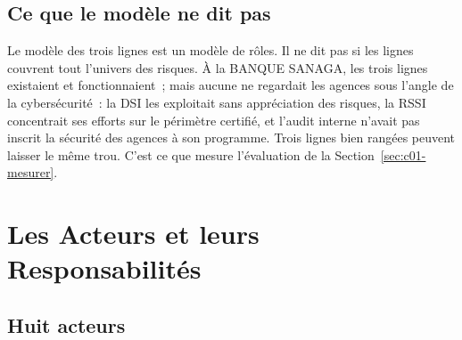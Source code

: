 \subsection{Ce que le modèle ne dit pas}

Le modèle des trois lignes est un modèle de rôles. Il ne dit pas si les
lignes couvrent tout l'univers des risques. À la BANQUE SANAGA, les trois
lignes existaient et fonctionnaient~; mais aucune ne regardait les agences
sous l'angle de la cybersécurité~: la DSI les exploitait sans appréciation
des risques, la RSSI concentrait ses efforts sur le périmètre certifié, et
l'audit interne n'avait pas inscrit la sécurité des agences à son
programme. Trois lignes bien rangées peuvent laisser le même trou. C'est
ce que mesure l'évaluation de la Section~\ref{sec:c01-mesurer}.

\section{Les Acteurs et leurs Responsabilités}
\label{sec:c01-acteurs}

\subsection{Huit acteurs}

